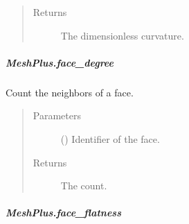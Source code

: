 \documentclass[letterpaper,10pt,english]{sphinxmanual}
\begin{document}
\begin{fulllineitems}
\begin{fulllineitems}
\begin{quote}
\begin{description}
\item[{Returns}] \leavevmode
{} \textendash{} The dimensionless curvature.

\end{description}\end{quote}

\end{fulllineitems}



\subparagraph{MeshPlus.face\_degree}
\label{\detokenize{api/generated/directional_clustering.mesh.MeshPlus.face_degree:meshplus-face-degree}}\label{\detokenize{api/generated/directional_clustering.mesh.MeshPlus.face_degree::doc}}

\begin{fulllineitems}
\label{\detokenize{api/generated/directional_clustering.mesh.MeshPlus.face_degree:directional_clustering.mesh.MeshPlus.face_degree}}
Count the neighbors of a face.
\begin{quote}\begin{description}
\item[{Parameters}] \leavevmode
{} () \textendash{} Identifier of the face.

\item[{Returns}] \leavevmode
{} \textendash{} The count.

\end{description}\end{quote}

\end{fulllineitems}



\subparagraph{MeshPlus.face\_flatness}
\label{\detokenize{api/generated/directional_clustering.mesh.MeshPlus.face_flatness:meshplus-face-flatness}}\label{\detokenize{api/generated/directional_clustering.mesh.MeshPlus.face_flatness::doc}}


\end{fulllineitems}
\end{document}
